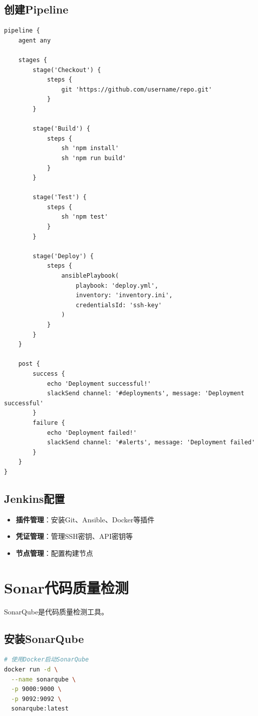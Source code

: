 \documentclass[12pt,UTF8]{ctexbook}
\begin{document}
\subsection*{创建Pipeline}
\begin{lstlisting}
pipeline {
    agent any
    
    stages {
        stage('Checkout') {
            steps {
                git 'https://github.com/username/repo.git'
            }
        }
        
        stage('Build') {
            steps {
                sh 'npm install'
                sh 'npm run build'
            }
        }
        
        stage('Test') {
            steps {
                sh 'npm test'
            }
        }
        
        stage('Deploy') {
            steps {
                ansiblePlaybook(
                    playbook: 'deploy.yml',
                    inventory: 'inventory.ini',
                    credentialsId: 'ssh-key'
                )
            }
        }
    }
    
    post {
        success {
            echo 'Deployment successful!'
            slackSend channel: '#deployments', message: 'Deployment successful'
        }
        failure {
            echo 'Deployment failed!'
            slackSend channel: '#alerts', message: 'Deployment failed'
        }
    }
}
\end{lstlisting}

\subsection*{Jenkins配置}
\begin{itemize}
    \item \textbf{插件管理}：安装Git、Ansible、Docker等插件
    \item \textbf{凭证管理}：管理SSH密钥、API密钥等
    \item \textbf{节点管理}：配置构建节点
\end{itemize}

\section{Sonar代码质量检测}
\label{sec:sonar}

SonarQube是代码质量检测工具。

\subsection*{安装SonarQube}
\begin{lstlisting}[language=bash]
# 使用Docker启动SonarQube
docker run -d \
  --name sonarqube \
  -p 9000:9000 \
  -p 9092:9092 \
  sonarqube:latest
\end{lstlisting}
\end{document}
